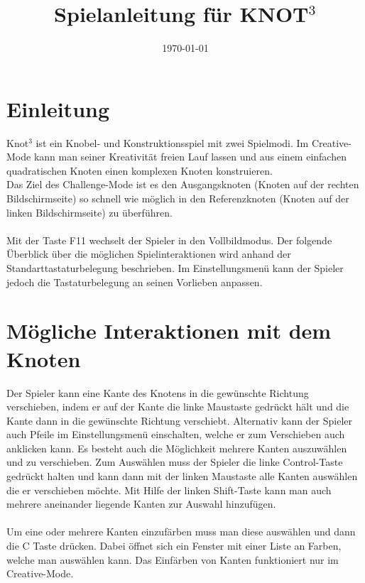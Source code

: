 \documentclass{report}
\begin{document}
\title{\textbf{Spielanleitung für KNOT$^3$}}
\date{\today}

\maketitle

\section*{Einleitung}
Knot$^3$ ist ein Knobel- und Konstruktionsspiel mit zwei Spielmodi.
Im Creative-Mode kann man seiner Kreativität freien Lauf lassen und aus einem einfachen quadratischen Knoten einen komplexen Knoten konstruieren.\\
Das Ziel des Challenge-Mode ist es den Ausgangsknoten (Knoten auf der rechten Bildschirmseite) so schnell wie möglich in den Referenzknoten (Knoten auf der linken Bildschirmseite) zu überführen. \\~\\ Mit der Taste F11 wechselt der Spieler in den Vollbildmodus. Der folgende Überblick über die möglichen Spielinteraktionen wird anhand der Standarttastaturbelegung beschrieben. Im Einstellungsmenü kann der Spieler jedoch die Tastaturbelegung an seinen Vorlieben anpassen.\\

\section*{Mögliche Interaktionen mit dem Knoten}
Der Spieler kann eine Kante des Knotens in die gewünschte Richtung verschieben, indem er auf der Kante die linke Maustaste gedrückt hält und die Kante dann in die gewünschte Richtung verschiebt. Alternativ kann der Spieler auch Pfeile im Einstellungsmenü einschalten,  welche er zum Verschieben auch anklicken kann. Es besteht auch die Möglichkeit mehrere Kanten auszuwählen und zu verschieben. Zum Auswählen muss der Spieler die linke Control-Taste gedrückt halten und kann dann mit der linken Maustaste alle Kanten auswählen die er verschieben möchte. Mit Hilfe der linken Shift-Taste kann man auch mehrere aneinander liegende Kanten zur Auswahl hinzufügen.\\~\\
Um eine oder mehrere Kanten einzufärben muss man diese auswählen und dann die C Taste drücken. Dabei öffnet sich ein Fenster mit einer Liste an Farben, welche man auswählen kann. Das Einfärben von Kanten funktioniert nur im Creative-Mode.
\end{document}
